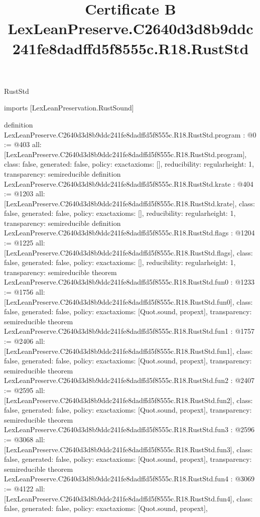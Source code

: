 \begin{lexlean}{RustStd}
\title{Certificate B LexLeanPreserve.C2640d3d8b9ddc241fe8dadffd5f8555c.R18.RustStd}
\begin{coremodule}
imports [LexLeanPreservation.RustSound]

definition LexLeanPreserve.C2640d3d8b9ddc241fe8dadffd5f8555c.R18.RustStd.program : @0 := @403 {
  all: [LexLeanPreserve.C2640d3d8b9ddc241fe8dadffd5f8555c.R18.RustStd.program],
  class: false,
  generated: false,
  policy: exact{axioms: []},
  reducibility: regular{height: 1},
  transparency: semireducible
}
definition LexLeanPreserve.C2640d3d8b9ddc241fe8dadffd5f8555c.R18.RustStd.krate : @404 := @1203 {
  all: [LexLeanPreserve.C2640d3d8b9ddc241fe8dadffd5f8555c.R18.RustStd.krate],
  class: false,
  generated: false,
  policy: exact{axioms: []},
  reducibility: regular{height: 1},
  transparency: semireducible
}
definition LexLeanPreserve.C2640d3d8b9ddc241fe8dadffd5f8555c.R18.RustStd.flags : @1204 := @1225 {
  all: [LexLeanPreserve.C2640d3d8b9ddc241fe8dadffd5f8555c.R18.RustStd.flags],
  class: false,
  generated: false,
  policy: exact{axioms: []},
  reducibility: regular{height: 1},
  transparency: semireducible
}
theorem LexLeanPreserve.C2640d3d8b9ddc241fe8dadffd5f8555c.R18.RustStd.fun0 : @1233 := @1756 {
  all: [LexLeanPreserve.C2640d3d8b9ddc241fe8dadffd5f8555c.R18.RustStd.fun0],
  class: false,
  generated: false,
  policy: exact{axioms: [Quot.sound, propext]},
  transparency: semireducible
}
theorem LexLeanPreserve.C2640d3d8b9ddc241fe8dadffd5f8555c.R18.RustStd.fun1 : @1757 := @2406 {
  all: [LexLeanPreserve.C2640d3d8b9ddc241fe8dadffd5f8555c.R18.RustStd.fun1],
  class: false,
  generated: false,
  policy: exact{axioms: [Quot.sound, propext]},
  transparency: semireducible
}
theorem LexLeanPreserve.C2640d3d8b9ddc241fe8dadffd5f8555c.R18.RustStd.fun2 : @2407 := @2595 {
  all: [LexLeanPreserve.C2640d3d8b9ddc241fe8dadffd5f8555c.R18.RustStd.fun2],
  class: false,
  generated: false,
  policy: exact{axioms: [Quot.sound, propext]},
  transparency: semireducible
}
theorem LexLeanPreserve.C2640d3d8b9ddc241fe8dadffd5f8555c.R18.RustStd.fun3 : @2596 := @3068 {
  all: [LexLeanPreserve.C2640d3d8b9ddc241fe8dadffd5f8555c.R18.RustStd.fun3],
  class: false,
  generated: false,
  policy: exact{axioms: [Quot.sound, propext]},
  transparency: semireducible
}
theorem LexLeanPreserve.C2640d3d8b9ddc241fe8dadffd5f8555c.R18.RustStd.fun4 : @3069 := @4122 {
  all: [LexLeanPreserve.C2640d3d8b9ddc241fe8dadffd5f8555c.R18.RustStd.fun4],
  class: false,
  generated: false,
  policy: exact{axioms: [Quot.sound, propext]},
}
\end{coremodule}
\end{lexlean}

